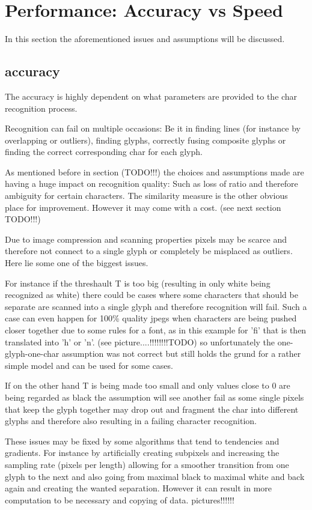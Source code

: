 \documentclass[12pt]{scrartcl}
\begin{document}
\section {Performance: Accuracy vs Speed}

In this section the aforementioned issues and assumptions will be discussed.

\subsection {accuracy}
The accuracy is highly dependent on what parameters are provided to the char recognition process.

Recognition can fail on multiple occasions: Be it in finding lines (for instance by overlapping or outliers), finding glyphs, correctly fusing composite glyphs or finding the correct corresponding char for each glyph.

As mentioned before in section (TODO!!!) the choices and assumptions made are having a huge impact on recognition quality: Such as loss of ratio and therefore ambiguity for certain characters. The similarity measure is the other obvious place for improvement. However it may come with a cost. (see next section TODO!!!)

Due to image compression and scanning properties pixels may be scarce and therefore not connect to a single glyph or completely be misplaced as outliers. Here lie some one of the biggest issues. 

For instance if the threshault T is too big (resulting in only white being recognized as white) there could be cases where some characters that should be separate are scanned into a single glyph and therefore recognition will fail.\newline
Such a case can even happen for 100\% quality jpegs when characters are being pushed closer together due to some rules for a font, as in this example for 'fi' that is then translated into 'h' or 'n'. (see picture....!!!!!!!!TODO) so unfortunately the one-glyph-one-char assumption was not correct but still holds the grund for a rather simple model and can be used for some cases.

If on the other hand T is being made too small and only values close to 0 are being regarded as black the assumption will see another fail as some single pixels that keep the glyph together may drop out and fragment the char into different glyphs and therefore also resulting in a failing character recognition.

These issues may be fixed by some algorithms that tend to tendencies and gradients. For instance by artificially creating subpixels and increasing the sampling rate (pixels per length) allowing for a smoother transition from one glyph to the next and also going from maximal black to maximal white and back again and creating the wanted separation. However it can result in more computation to be necessary and copying of data. pictures!!!!!!
\end{document}
